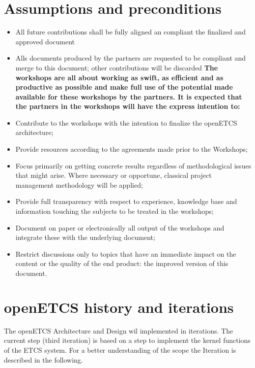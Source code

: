 \section{Assumptions and preconditions}
\begin{itemize}
\item All future contributions shall be fully aligned an compliant the finalized and approved document 
\item Alls documents produced by the partners are requested to be compliant and merge to this document; other contributions will be discarded
\textbf{The workshops are all about working as swift, as efficient and as productive as possible and make full use of the potential made available for these workshops by the partners. It is expected that the partners in the workshops will have the express intention to:}
\item Contribute to the workshops with the intention to finalize the openETCS architecture;\\
\item Provide resources according to the agreements made prior to the Workshops;\\
\item Focus primarily on  getting concrete results regardless of methodological issues that might arise. Where necessary or opportune, classical project management methodology will be applied;\\
\item Provide full transparency with respect to experience, knowledge base and information touching the subjects to be treated in the workshops;\\
\item Document on paper or electronically all output of the workshops and integrate these with the underlying document;\\
\item Restrict discussions only to topics that have an immediate impact on the content or the quality of the end product: the improved version of this document.\\
\end{itemize}

\section{openETCS history and iterations}
The openETCS Architecture and Design wil implemented in iterations. The current step (third iteration) is based on a step to implement the kernel functions of the ETCS system. For a better understanding of the scope the Iteration is described in the following.

